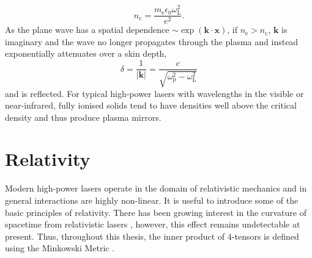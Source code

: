 \begin{equation}
	n_\mathrm{c} = \frac{m_\mathrm{e}\epsilon_0 \omega_\mathrm{L}^2}{e^2}.
\end{equation}
As the plane wave has a spatial dependence $\sim \exp{(\mathbf{k}\cdot\mathbf{x})}$, if $n_\mathrm{e} > n_\mathrm{c}$, $\mathbf{k}$ is imaginary and the wave no longer propagates through the plasma and instead exponentially attenuates over a skin depth,
\begin{equation}
	\delta = \frac{1}{|\mathbf{k}|} = \frac{c}{\sqrt{\omega_\mathrm{p}^2 - \omega_\mathrm{L}^2}}
\end{equation}
and is reflected. For typical high-power lasers with wavelengths in the visible or near-infrared, fully ionised solids tend to have densities well above the critical density and thus produce plasma mirrors.

\section{Relativity}
Modern high-power lasers operate in the domain of relativistic mechanics and in general interactions are highly non-linear. It is useful to introduce some of the basic principles of relativity. There has been growing interest in the curvature of spacetime from relativistic lasers \cite{atongaGravitationalWavesHighpower2023}, however, this effect remains undetectable at present. Thus, throughout this thesis, the inner product of 4-tensors is defined using the Minkowski Metric \cite{steaneRelativityMadeRelatively2012}. 

